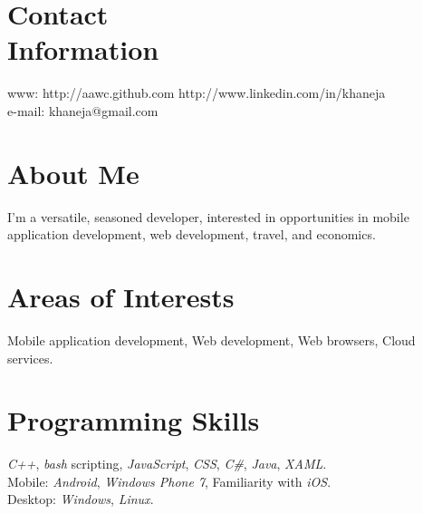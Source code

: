 \documentclass[margin,line]{resume}
\begin{document}
	\begin{resume}
	
	\section{\mysidestyle Contact\\Information}
	
	www: http://aawc.github.com \hfill http://www.linkedin.com/in/khaneja\vspace{0mm}\\\vspace{0mm}%
	e-mail: khaneja@gmail.com    \hfill \vspace{0mm}%

	\section{\mysidestyle About Me}
	I'm a versatile, seasoned developer, interested in opportunities in mobile application development, web development, travel, and economics.
	\section{\mysidestyle Areas of Interests}
	Mobile application development, Web development, Web browsers, Cloud services.
	\section{\mysidestyle Programming Skills}
	\textit{C++}, \textit{bash} scripting, \textit{JavaScript}, \textit{CSS}, \textit{C\#}, \textit{Java}, \textit{XAML}.\\
	Mobile: \textit{Android}, \textit{Windows Phone 7}, Familiarity with \textit{iOS}.\\
	Desktop: \textit{Windows}, \textit{Linux}.


\end{resume}
\end{document}
